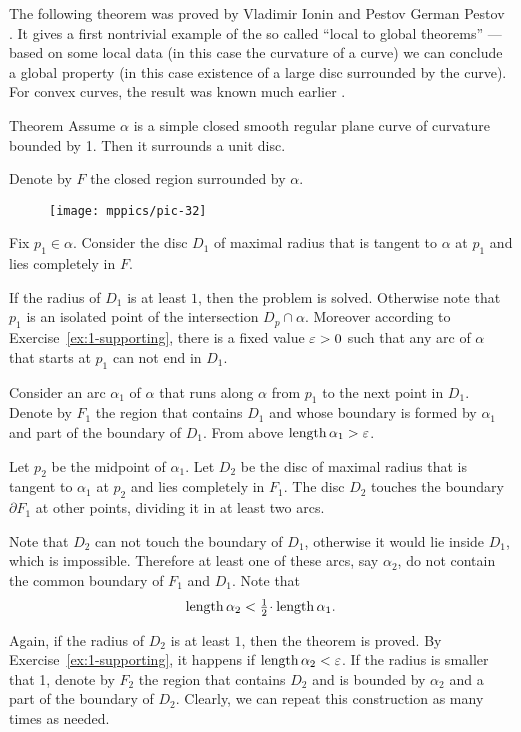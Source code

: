 The following theorem was proved by Vladimir Ionin and Pestov German Pestov \cite{pestov-ionin}.
It gives a first nontrivial example of the so called ``local to global theorems'' --- based on some local data (in this case the curvature of a curve) we can conclude a global property (in this case existence of a large disc surrounded by the curve).
For convex curves, the result was known much earlier \cite[\S 24]{blaschke}.

\begin{thm}{Theorem}\label{thm:moon}
Assume $\alpha$ is a simple closed smooth regular plane curve of curvature bounded by 1.
Then it surrounds a unit disc.
\end{thm}

Denote by $F$ the closed region surrounded by $\alpha$. 

\begin{figure}[h!]%
\vskip-0mm
\centering
\texttt{[image: mppics/pic-32]}
\vskip0mm
\end{figure}

Fix $p_1\in \alpha$.
Consider the disc $D_1$ of maximal radius 
that is tangent to $\alpha$ at $p_1$ and lies completely in $F$.

If the radius of $D_1$ is at least $1$, then the problem is solved.
Otherwise note that $p_1$ is an isolated point of the intersection $D_p\cap \alpha$.
Moreover according to Exercise~\ref{ex:1-supporting}, there is a fixed value $\varepsilon>0$ such that any arc of $\alpha$
that starts at $p_1$ can not end in $D_1$.


Consider an arc $\alpha_1$ of $\alpha$ that runs along $\alpha$ from $p_1$ to the next point in $D_1$.
Denote by $F_1$ the region that contains $D_1$ and whose boundary is formed by $\alpha_1$ and part of the boundary of $D_1$.
From above $\mathop{\rm length}\nolimits \alpha_1>\varepsilon$.

Let $p_2$ be the midpoint of $\alpha_1$.
Let $D_2$ be the disc of maximal radius that is tangent to $\alpha_1$ at $p_2$ and lies completely in $F_1$. 
The disc $D_2$ touches the boundary $\partial F_1$ at other points, dividing it in at least two arcs.

Note that $D_2$ can not touch the boundary of $D_1$, otherwise it would lie inside $D_1$, which is impossible.
Therefore at least one of these arcs, say $\alpha_2$, do not contain the common boundary of $F_1$ and $D_1$.
Note that 
\[\length \alpha_2< \tfrac12\cdot\length\alpha_1.\]

Again, if the radius of $D_2$ is at least $1$, then the theorem is proved.
By Exercise~\ref{ex:1-supporting}, it happens if $\mathop{\rm length}\nolimits \alpha_2<\varepsilon$.
If the radius is smaller that 1, denote by $F_2$ the region that contains $D_2$ and is bounded by $\alpha_2$ and a part of the boundary of $D_2$. Clearly, we can repeat this construction as many times as needed. 

